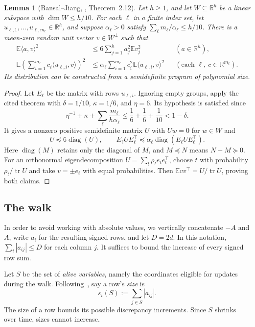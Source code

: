 \documentclass[reqno]{amsart}
\newtheorem{lemma}[theorem]{Lemma}
\theoremstyle{definition}
\newcommand{\R}{\mathbb R}
\newcommand{\E}{\mathbb E}
\newcommand{\ip}[2]{\langle#1,#2\rangle}
\begin{document}
\begin{lemma}[Bansal--Jiang, \cite{BJexp}, Theorem~2.12]
\label{lem:covariance}
Let $h\ge1$, and let $W\subseteq\R^h$ be a linear subspace with $\dim W\le h/10$. For each $\ell$ in a finite index set, let $u_{\ell,1},\ldots,u_{\ell,m_\ell}\in\R^h$, and suppose $\alpha_\ell>0$ satisfy $\sum_\ell m_\ell/\alpha_\ell\le h/10$. There is a mean-zero random unit vector $v\in W^\perp$ such that
\begin{align}
  \E\ip{a}{v}^2 &\le 6\sum_{j=1}^h a_j^2\E v_j^2 &&(a\in\R^h),\label{eq:coordinate-covariance}\\
  \E\left(\sum_{i=1}^{m_\ell} c_i\ip{u_{\ell,i}}{v}\right)^2 &\le\alpha_\ell\sum_{i=1}^{m_\ell} c_i^2\E\ip{u_{\ell,i}}{v}^2 &&(\text{each }\ell,\ c\in\R^{m_\ell}).\label{eq:row-covariance}
\end{align}
Its distribution can be constructed from a semidefinite program of polynomial size.
\end{lemma}
\begin{proof}
Let $E_\ell$ be the matrix with rows $u_{\ell,i}$. Ignoring empty groups, apply the cited theorem with $\delta=1/10$, $\kappa=1/6$, and $\eta=6$. Its hypothesis is satisfied since
\[ \eta^{-1}+\kappa+ \sum_\ell\frac{m_\ell}{h\alpha_\ell} \le\frac16+\frac16+\frac1{10}<1-\delta. \]
It gives a nonzero positive semidefinite matrix $U$ with $Uw=0$ for $w\in W$ and
\[ U\preceq6\operatorname{diag}(U),\qquad E_\ell U E_\ell^\top \preceq\alpha_\ell \operatorname{diag}(E_\ell U E_\ell^\top). \]
Here $\operatorname{diag}(M)$ retains only the diagonal of $M$, and $M\preceq N$ means $N-M\succeq0$. For an orthonormal eigendecomposition $U=\sum_t\rho_t e_te_t^\top$, choose $t$ with probability $\rho_t/\operatorname{tr}U$ and take $v=\pm e_t$ with equal probabilities. Then $\E vv^\top=U/\operatorname{tr}U$, proving both claims.
\end{proof}

\subsection{The walk}

In order to avoid working with absolute values, we vertically concatenate $-A$ and $A$, write $a_i$ for the resulting signed rows, and let $D=2d$. In this notation, $\sum_i|a_{ij}|\le D$ for each column $j$. It suffices to bound the increase of every signed row sum.

Let $S$ be the set of \emph{alive variables}, namely the coordinates eligible for updates during the walk. Following~\cite[Sections~3.1 and~5.1]{BJ}, say a row's \emph{size} is
\[ s_i(S):=\sum_{j\in S}|a_{ij}|. \]
The size of a row bounds its possible discrepancy increments. Since $S$ shrinks over time, sizes cannot increase.
\end{document}
